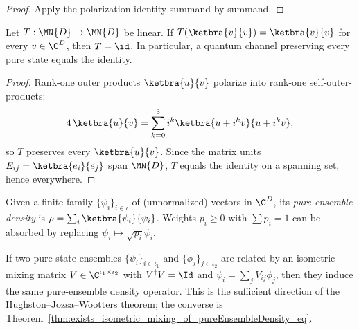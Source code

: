 \begin{proof}
    \leanok
    Apply the polarization identity summand-by-summand.
\end{proof}

\begin{theorem}
    \label{thm:linearMap_eq_id_of_fixes_rankOne}
    \leanok
    Let $T : \MN{D} \to \MN{D}$ be linear. If $T(\ketbra{v}{v})
        = \ketbra{v}{v}$ for every $v \in \C^D$, then
    $T = \id$. In particular, a quantum channel preserving every
    pure state equals the identity.
\end{theorem}

\begin{proof}
    \leanok
    Rank-one outer products $\ketbra{u}{v}$ polarize into rank-one
    self-outer-products:
    \[
        4\,\ketbra{u}{v}
        = \sum_{k=0}^3 i^k \ketbra{u + i^k v}{u + i^k v},
    \]
    so $T$ preserves every $\ketbra{u}{v}$. Since the matrix units
    $E_{ij} = \ketbra{e_i}{e_j}$ span $\MN{D}$, $T$ equals the
    identity on a spanning set, hence everywhere.
\end{proof}

\begin{definition}
    \label{def:pureEnsembleDensity}
    \leanok
    Given a finite family $\{\psi_i\}_{i \in \iota}$ of (unnormalized)
    vectors in $\C^D$, its \emph{pure-ensemble density} is
    $\rho = \sum_i \ketbra{\psi_i}{\psi_i}$. Weights
    $p_i \geq 0$ with $\sum p_i = 1$ can be absorbed by replacing
    $\psi_i \mapsto \sqrt{p_i} \psi_i$.
\end{definition}

\begin{theorem}
    \label{thm:pureEnsembleDensity_eq_of_isometric_mixing}
    \leanok
    If two pure-state ensembles $\{\psi_i\}_{i \in \iota_1}$ and
    $\{\phi_j\}_{j \in \iota_2}$ are related by an isometric mixing
    matrix $V \in \C^{\iota_1 \times \iota_2}$ with
    $V^\dagger V = \Id$ and $\psi_i = \sum_j V_{ij} \phi_j$, then
    they induce the same pure-ensemble density operator. This is the
    sufficient direction of the Hughston--Jozsa--Wootters theorem; the
    converse is Theorem~\ref{thm:exists_isometric_mixing_of_pureEnsembleDensity_eq}.
\end{theorem}

